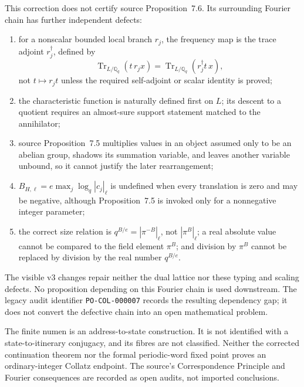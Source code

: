 \begin{sourceissue}
This correction does not certify source Proposition~7.6.  Its surrounding
Fourier chain has further independent defects:
\begin{enumerate}
\item for a nonscalar bounded local branch $r_j$, the frequency map is the
  trace adjoint $r_j^\dagger$, defined by
  \[
   \operatorname{Tr}_{L/\mathbb Q_q}(t\,r_jx)
   =\operatorname{Tr}_{L/\mathbb Q_q}(r_j^\dagger t\,x),
  \]
  not $t\mapsto r_jt$ unless the required self-adjoint or scalar identity is
  proved;
\item the characteristic function is naturally defined first on $L$; its
  descent to a quotient requires an almost-sure support statement matched to
  the annihilator;
\item source Proposition~7.5 multiplies values in an object assumed only to
  be an abelian group, shadows its summation variable, and leaves another
  variable unbound, so it cannot justify the later rearrangement;
\item $B_{H,\ell}=e\max_j\log_q|c_j|_\ell$ is undefined when every
  translation is zero and may be negative, although Proposition~7.5 is
  invoked only for a nonnegative integer parameter;
\item the correct size relation is
  $q^{B/e}=|\pi^{-B}|_\ell$, not $|\pi^B|_\ell$; a real absolute value cannot
  be compared to the field element $\pi^B$; and division by $\pi^B$ cannot
  be replaced by division by the real number $q^{B/e}$.
\end{enumerate}
The visible v3 changes repair neither the dual lattice nor these typing and
scaling defects.  No proposition depending on this Fourier chain is used
downstream.  The legacy audit identifier
\texttt{PO-COL-}\allowbreak\texttt{000007} records the resulting dependency
gap; it does not convert the defective chain into an open mathematical problem.
\end{sourceissue}

\begin{nonclaim}
The finite numen is an address-to-state construction.  It is not identified
with a state-to-itinerary conjugacy, and its fibres are not classified.
Neither the corrected continuation theorem nor the formal periodic-word
fixed point proves an ordinary-integer Collatz endpoint.  The source's
Correspondence Principle and Fourier consequences are recorded as open
audits, not imported conclusions.
\end{nonclaim}
